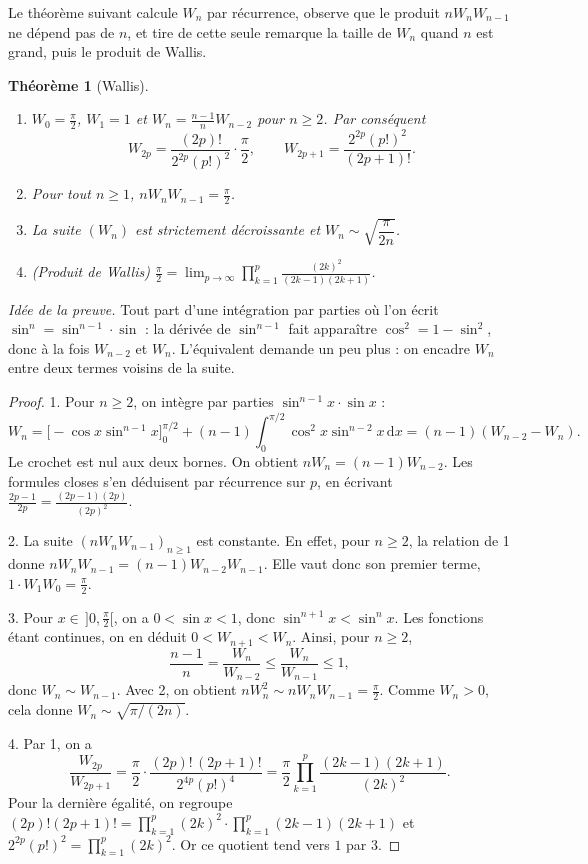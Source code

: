 \documentclass[11pt,a4paper]{article}
\theoremstyle{plain}
\newtheorem{theoreme}{Théorème}[section]
\theoremstyle{definition}
\theoremstyle{remark}
\newcommand{\dd}{\,\mathrm{d}}
\begin{document}
Le théorème suivant calcule $W_n$ par récurrence, observe que le produit $nW_nW_{n-1}$ ne dépend pas de $n$, et tire de cette seule remarque la taille de $W_n$ quand $n$ est grand, puis le produit de Wallis.

\begin{theoreme}[Wallis]\label{thm:wallis}
\begin{enumerate}[nosep]
\item $W_0=\frac\pi2$, $W_1=1$ et $W_n=\frac{n-1}{n}W_{n-2}$ pour $n\geq2$. Par conséquent
\[
  W_{2p}=\frac{(2p)!}{2^{2p}(p!)^2}\cdot\frac\pi2,\qquad W_{2p+1}=\frac{2^{2p}(p!)^2}{(2p+1)!}.
\]
\item Pour tout $n\geq1$, $nW_nW_{n-1}=\frac\pi2$.
\item La suite $(W_n)$ est strictement décroissante et $W_n\sim\sqrt{\dfrac{\pi}{2n}}$.
\item (Produit de Wallis) $\displaystyle\frac\pi2=\lim_{p\to\infty}\prod_{k=1}^{p}\frac{(2k)^2}{(2k-1)(2k+1)}$.
\end{enumerate}
\end{theoreme}

\emph{Idée de la preuve.} Tout part d'une intégration par parties où l'on écrit $\sin^n=\sin^{n-1}\cdot\sin$ : la dérivée de $\sin^{n-1}$ fait apparaître $\cos^2=1-\sin^2$, donc à la fois $W_{n-2}$ et $W_n$. L'équivalent demande un peu plus : on encadre $W_n$ entre deux termes voisins de la suite.

\begin{proof}
1. Pour $n\geq2$, on intègre par parties $\sin^{n-1}x\cdot\sin x$ :
\[
  W_n=\big[-\cos x\sin^{n-1}x\big]_0^{\pi/2}+(n-1)\int_0^{\pi/2}\cos^2x\sin^{n-2}x\dd x=(n-1)(W_{n-2}-W_n).
\]
Le crochet est nul aux deux bornes. On obtient $nW_n=(n-1)W_{n-2}$. Les formules closes s'en déduisent par récurrence sur $p$, en écrivant $\frac{2p-1}{2p}=\frac{(2p-1)(2p)}{(2p)^2}$.

2. La suite $(nW_nW_{n-1})_{n\geq1}$ est constante. En effet, pour $n\geq2$, la relation de 1 donne $nW_nW_{n-1}=(n-1)W_{n-2}W_{n-1}$. Elle vaut donc son premier terme, $1\cdot W_1W_0=\frac\pi2$.

3. Pour $x\in\,]0,\frac\pi2[$, on a $0<\sin x<1$, donc $\sin^{n+1}x<\sin^nx$. Les fonctions étant continues, on en déduit $0<W_{n+1}<W_n$. Ainsi, pour $n\geq2$,
\[
  \frac{n-1}{n}=\frac{W_n}{W_{n-2}}\leq\frac{W_n}{W_{n-1}}\leq1,
\]
donc $W_n\sim W_{n-1}$. Avec 2, on obtient $nW_n^2\sim nW_nW_{n-1}=\frac\pi2$. Comme $W_n>0$, cela donne $W_n\sim\sqrt{\pi/(2n)}$.

4. Par 1, on a
\[
  \frac{W_{2p}}{W_{2p+1}}=\frac{\pi}{2}\cdot\frac{(2p)!\,(2p+1)!}{2^{4p}(p!)^4}=\frac\pi2\prod_{k=1}^p\frac{(2k-1)(2k+1)}{(2k)^2}.
\]
Pour la dernière égalité, on regroupe $(2p)!(2p+1)!=\prod_{k=1}^p(2k)^2\cdot\prod_{k=1}^p(2k-1)(2k+1)$ et $2^{2p}(p!)^2=\prod_{k=1}^p(2k)^2$. Or ce quotient tend vers $1$ par 3.
\end{proof}
\end{document}
